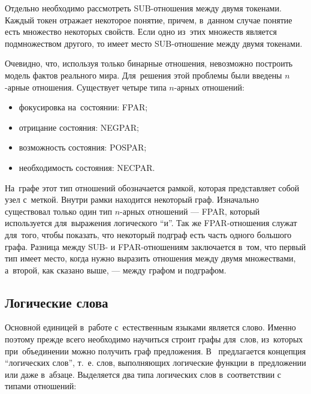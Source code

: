 Отдельно необходимо рассмотреть SUB-отношения между двумя токенами. 
Каждый токен отражает некоторое понятие, 
причем, в~данном случае понятие есть множество некоторых свойств. 
Если одно из~этих  множеств является подмножеством другого, 
то имеет место SUB-отношение между двумя токенами.

Очевидно, что, используя только бинарные отношения, невозможно построить модель фактов реального мира.
Для~решения этой проблемы были введены $n$-арные отношения. 
Существует четыре типа $n$-арных отношений:

\begin {itemize}

\item{
фокусировка на~состоянии: FPAR;
}

\item{
отрицание состояния: NEGPAR;
}

\item{
возможность состояния: POSPAR; 
}

\item{
необходимость состояния: NECPAR.
}

\end{itemize}

На~графе этот тип отношений обозначается рамкой, которая представляет собой  узел с~меткой. 
Внутри рамки находится некоторый граф.
Изначально существовал только один тип $n$-арных отношений --- FPAR, 
который используется для~выражения логического ``и''.
Так же FPAR-отношения служат для~того, чтобы показать, что некоторый подграф есть часть одного большого графа. 
Разница между SUB- и FPAR-отношениям заключается в~том, 
что первый тип имеет место, когда нужно выразить отношения между двумя множествами, 
а~второй, как сказано выше, --- между графом и подграфом.


\subsection {Логические слова}

Основной единицей в~работе с~естественным языками является слово.
Именно поэтому прежде всего необходимо научиться  строит графы для~слов, 
из~которых при~объединении можно получить граф предложения.
В~\cite{knowledge_graph} предлагается концепция ``логических слов'', т.~е.
слов, выполняющих логические функции в~предложении или даже в~абзаце.
Выделяется два типа логических слов в~соответствии с типами отношений:

